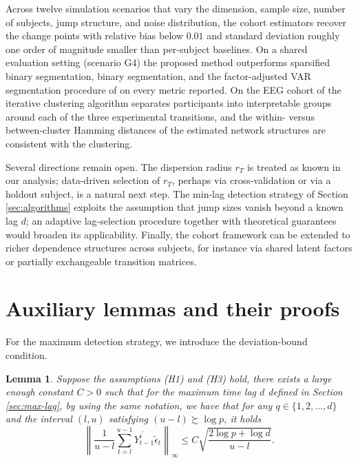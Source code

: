 \documentclass[11pt]{article}
\newtheorem{lemma}{Lemma}[section]
\begin{document}
Across twelve simulation scenarios that vary the dimension, sample size, number of subjects, jump structure, and noise distribution, the cohort estimators recover the change points with relative bias below $0.01$ and standard deviation roughly one order of magnitude smaller than per-subject baselines. On a shared evaluation setting (scenario G4) the proposed method outperforms sparsified binary segmentation, binary segmentation, and the factor-adjusted VAR segmentation procedure of \cite{cho2023high} on every metric reported. On the EEG cohort of \cite{trujillo2017effect} the iterative clustering algorithm separates participants into interpretable groups around each of the three experimental transitions, and the within- versus between-cluster Hamming distances of the estimated network structures are consistent with the clustering.

Several directions remain open. The dispersion radius $r_T$ is treated as known in our analysis; data-driven selection of $r_T$, perhaps via cross-validation or via a holdout subject, is a natural next step. The min-lag detection strategy of Section \ref{sec:algorithms} exploits the assumption that jump sizes vanish beyond a known lag $d$; an adaptive lag-selection procedure together with theoretical guarantees would broaden its applicability. Finally, the cohort framework can be extended to richer dependence structures across subjects, for instance via shared latent factors or partially exchangeable transition matrices.

\printbibliography

\newpage
\appendix
\section{Auxiliary lemmas and their proofs}
For the maximum detection strategy, we introduce the deviation-bound condition. 
\begin{lemma}
\label{lemma:1}
Suppose the assumptions (H1) and (H3) hold, there exists a large enough constant $C>0$ such that for the maximum time lag $d$ defined in Section \ref{sec:max-lag}, by using the same notation, we have that for any $q \in \{1,2,\dots, d\}$ and the interval $(l,u)$ satisfying $(u-l) \succsim \log p$, it holds
\begin{equation*}
    \left\| \frac{1}{u-l}\sum_{t=l}^{u-1}Y_{t-1}^{i^\prime}\widetilde{\epsilon}_t \right\|_\infty \leq C\sqrt{\frac{2\log p + \log d}{u-l}}.
\end{equation*}
\end{lemma}
\end{document}
